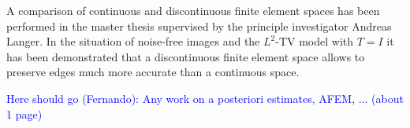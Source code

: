 \documentclass[enabledeprecatedfontcommands,cleardoublepage=empty,headsepline,twoside,11pt,DIV=15,BCOR=12mm,final]{scrartcl}
\begin{document}
A comparison of continuous and discontinuous finite element spaces has been performed in the master thesis  supervised by the principle investigator Andreas Langer. In the situation of noise-free images and the $L^2$-TV model with $T=I$ it has been demonstrated that a discontinuous finite element space allows to preserve edges much more accurate than a continuous space.


\textcolor{blue}{Here should go (Fernando): Any work on a posteriori estimates, AFEM, ... (about 1 page)}
\end{document}

